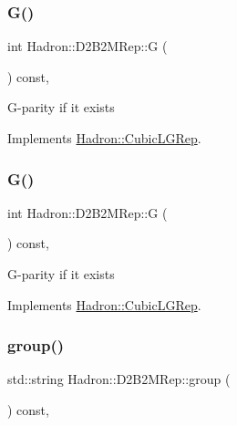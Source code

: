 \subsubsection{\texorpdfstring{G()}{G()}\hspace{0.1cm}{\footnotesize\ttfamily [2/3]}}
{\footnotesize\ttfamily int Hadron\+::\+D2\+B2\+M\+Rep\+::G (\begin{DoxyParamCaption}{ }\end{DoxyParamCaption}) const\hspace{0.3cm}{\ttfamily [inline]}, {\ttfamily [virtual]}}

G-\/parity if it exists 

Implements \mbox{\hyperlink{structHadron_1_1CubicLGRep_ace26f7b2d55e3a668a14cb9026da5231}{Hadron\+::\+Cubic\+L\+G\+Rep}}.

\mbox{\label{structHadron_1_1D2B2MRep_a084bfd1709cfe35d65be35b8950cb32c}} 
\subsubsection{\texorpdfstring{G()}{G()}\hspace{0.1cm}{\footnotesize\ttfamily [3/3]}}
{\footnotesize\ttfamily int Hadron\+::\+D2\+B2\+M\+Rep\+::G (\begin{DoxyParamCaption}{ }\end{DoxyParamCaption}) const\hspace{0.3cm}{\ttfamily [inline]}, {\ttfamily [virtual]}}

G-\/parity if it exists 

Implements \mbox{\hyperlink{structHadron_1_1CubicLGRep_ace26f7b2d55e3a668a14cb9026da5231}{Hadron\+::\+Cubic\+L\+G\+Rep}}.

\mbox{\label{structHadron_1_1D2B2MRep_a5eb48e359e6867273037597c30363ba7}} 
\subsubsection{\texorpdfstring{group()}{group()}\hspace{0.1cm}{\footnotesize\ttfamily [1/3]}}
{\footnotesize\ttfamily std\+::string Hadron\+::\+D2\+B2\+M\+Rep\+::group (\begin{DoxyParamCaption}{ }\end{DoxyParamCaption}) const\hspace{0.3cm}{\ttfamily [inline]}, {\ttfamily [virtual]}}

